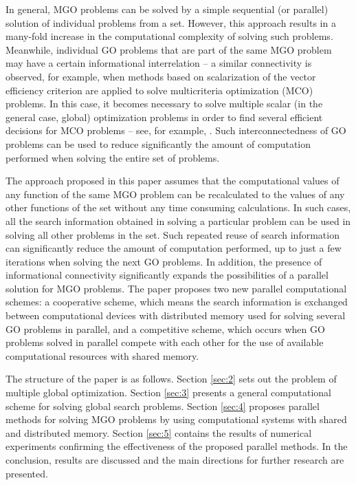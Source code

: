 \documentclass[review]{elsarticle}
\begin{document}
In general, MGO problems can be solved by a simple sequential (or parallel) solution of individual problems from a set. However, this approach results in a many-fold increase in the computational complexity of solving such problems. Meanwhile, individual GO problems that are part of the same MGO problem may have a certain informational interrelation -- a similar connectivity is observed, for example, when methods based on scalarization of the vector efficiency criterion are applied to solve multicriteria optimization (MCO) problems. In this case, it becomes necessary to solve multiple scalar (in the general case, global) optimization problems in order to find several efficient decisions  for MCO problems -- see, for example, \cite{c29,c30,c31,c32,c33}. Such interconnectedness of GO problems can be used to reduce significantly the amount of computation performed when solving the entire set of problems.

The approach proposed in this paper assumes that the computational values of any function of the same MGO problem can be recalculated to the values of any other functions of the set without any time consuming calculations. In such cases, all the search information obtained in solving a particular problem can be used in solving all other problems in the set. Such repeated reuse of search information can significantly reduce the amount of computation performed, up to just a few iterations when solving the next GO problems. In addition, the presence of informational connectivity significantly expands the possibilities of a parallel solution for MGO problems. The paper proposes two new parallel computational schemes: a cooperative scheme, which means the search information is exchanged between computational devices with distributed memory used for solving several GO problems in parallel, and a competitive scheme, which occurs when GO problems solved in parallel compete with each other for the use of available computational resources with shared memory.

The structure of the paper is as follows. Section \ref{sec:2} sets out the problem of multiple global optimization. Section \ref{sec:3} presents a general computational scheme for solving global search problems. Section \ref{sec:4} proposes parallel methods for solving MGO problems by using computational systems with shared and distributed memory. Section \ref{sec:5} contains the results of numerical experiments confirming the effectiveness of the proposed parallel methods. In the conclusion, results are discussed and the main directions for further research are presented.
\end{document}
